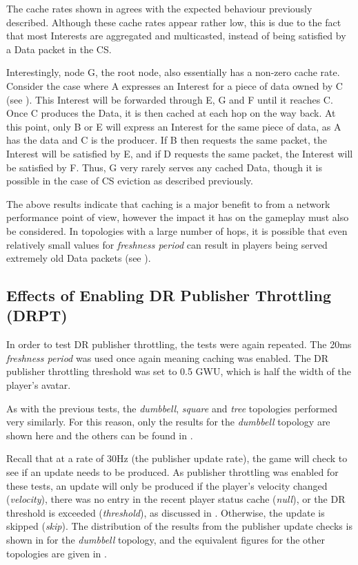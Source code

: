 The cache rates shown in  agrees with the expected behaviour previously described. Although these cache rates appear rather low, this is due to the fact that most Interests are aggregated and multicasted, instead of being satisfied by a Data packet in the CS.

Interestingly, node G, the root node, also essentially has a non-zero cache rate. Consider the case where A expresses an Interest for a piece of data owned by C (see ). This Interest will be forwarded through E, G and F until it reaches C. Once C produces the Data, it is then cached at each hop on the way back. At this point, only B or E will express an Interest for the same piece of data, as A has the data and C is the producer. If B then requests the same packet, the Interest will be satisfied by E, and if D requests the same packet, the Interest will be satisfied by F. Thus, G very rarely serves any cached Data, though it is possible in the case of CS eviction as described previously. 

The above results indicate that caching is a major benefit to \game{} from a network performance point of view, however the impact it has on the gameplay must also be considered. In topologies with a large number of hops, it is possible that even relatively small values for \textit{freshness period} can result in players being served extremely old Data packets (see ).


\subsection{Effects of Enabling DR Publisher Throttling (DRPT)}
In order to test DR publisher throttling, the tests were again repeated. The 20ms \textit{freshness period} was used once again meaning caching was enabled. The DR publisher throttling threshold was set to 0.5 GWU, which is half the width of the player's avatar. 

As with the previous tests, the \textit{dumbbell}, \textit{square} and \textit{tree} topologies performed very similarly. For this reason, only the results for the \textit{dumbbell} topology are shown here and the others can be found in .

Recall that at a rate of 30Hz (the publisher update rate), the game will check to see if an update needs to be produced. As publisher throttling was enabled for these tests, an update will only be produced if the player's velocity changed (\textit{velocity}), there was no entry in the recent player status cache (\textit{null}), or the DR threshold is exceeded (\textit{threshold}), as discussed in . Otherwise, the update is skipped (\textit{skip}). The distribution of the results from the publisher update checks is shown in  for the \textit{dumbbell} topology, and the equivalent figures for the other topologies are given in .

